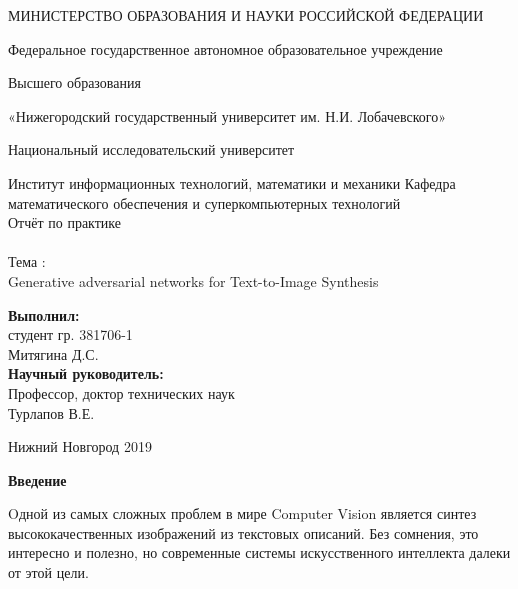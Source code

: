 \documentclass{article}
\begin{document}
    \begin{center} 
    \large МИНИСТЕРСТВО ОБРАЗОВАНИЯ И НАУКИ РОССИЙСКОЙ ФЕДЕРАЦИИ

Федеральное государственное автономное образовательное учреждение

Высшего образования

«Нижегородский государственный университет им. Н.И. Лобачевского»

Национальный исследовательский университет

Институт информационных технологий, математики и механики 
Кафедра математического обеспечения и суперкомпьютерных технологий\\[3.5cm] 
    
    \huge Отчёт по практике \\[0.6cm] %
    \\ 
    \huge{Тема :}\\[0.6cm]
    \large Generative adversarial networks for Text-to-Image Synthesis\\[7.7cm]
    
    
    \end{center} 
    
    \begin{flushright}
    \textbf{Выполнил:} \\
    студент гр. 381706-1 \\
    Митягина Д.С. \\
    \textbf{Научный руководитель:} \\
    Профессор, доктор технических наук\\
    Турлапов В.Е. \\
    [4.7cm]
    \end{flushright}
    
    
    
    \begin{center} 
    \large Нижний Новгород 2019
    \end{center} 
    
    \thispagestyle{empty}
    \newpage
      \begin{center}
      \end{center}
    \newpage
    \begin{center} 
      \huge \textbf{Введение} \\[1.3cm]
    \end{center} 
      \large Oдной из самых сложных проблем в мире Computer Vision является синтез высококачественных изображений из текстовых описаний. Без сомнения, это интересно и полезно, но современные системы искусственного интеллекта далеки от этой цели.
\end{document}
